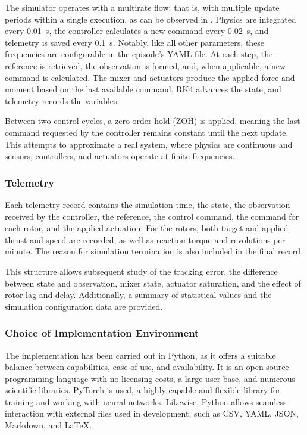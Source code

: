 The simulator operates with a multirate flow; that is, with multiple update periods within a single execution, as can be observed in . Physics are integrated every \SI{0.01}{s}, the controller calculates a new command every \SI{0.02}{s}, and telemetry is saved every \SI{0.1}{s}. Notably, like all other parameters, these frequencies are configurable in the episode's YAML file. At each step, the reference is retrieved, the observation is formed, and, when applicable, a new command is calculated. The mixer and actuators produce the applied force and moment based on the last available command, RK4 advances the state, and telemetry records the variables.

Between two control cycles, a zero-order hold (ZOH) is applied, meaning the last command requested by the controller remains constant until the next update. This attempts to approximate a real system, where physics are continuous and sensors, controllers, and actuators operate at finite frequencies.

\subsubsection*{Telemetry}

Each telemetry record contains the simulation time, the state, the observation received by the controller, the reference, the control command, the command for each rotor, and the applied actuation. For the rotors, both target and applied thrust and speed are recorded, as well as reaction torque and revolutions per minute. The reason for simulation termination is also included in the final record.

This structure allows subsequent study of the tracking error, the difference between state and observation, mixer state, actuator saturation, and the effect of rotor lag and delay. Additionally, a summary of statistical values and the simulation configuration data are provided.

\subsubsection*{Choice of Implementation Environment}

The implementation has been carried out in Python, as it offers a suitable balance between capabilities, ease of use, and availability. It is an open-source programming language with no licensing costs, a large user base, and numerous scientific libraries. PyTorch is used, a highly capable and flexible library for training and working with neural networks. Likewise, Python allows seamless interaction with external files used in development, such as CSV, YAML, JSON, Markdown, and LaTeX.

